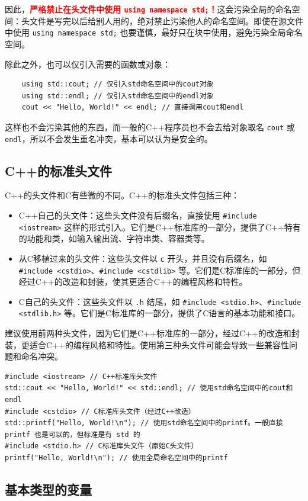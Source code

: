 因此，\textcolor{red}{\bfseries 严格禁止在头文件中使用 \texttt{using namespace std;}！}这会污染全局的命名空间：头文件是写完以后给别人用的，绝对禁止污染他人的命名空间。即使在源文件中使用 \verb|using namespace std;| 也要谨慎，最好只在块中使用，避免污染全局命名空间。

除此之外，也可以仅引入需要的函数或对象：
\begin{verbatim}
    using std::cout; // 仅引入std命名空间中的cout对象
    using std::endl; // 仅引入std命名空间中的endl对象
    cout << "Hello, World!" << endl; // 直接调用cout和endl
\end{verbatim}
这样也不会污染其他的东西，而一般的C++程序员也不会去给对象取名 \verb|cout| 或 \verb|endl|，所以不会发生重名冲突，基本可以认为是安全的。

\subsection{C++的标准头文件}

C++的头文件和C有些微的不同。C++的标准头文件包括三种：
\begin{itemize}
    \item C++自己的头文件：这些头文件没有后缀名，直接使用 \verb|#include <iostream>| 这样的形式引入。它们是C++标准库的一部分，提供了C++特有的功能和类，如输入输出流、字符串类、容器类等。
    \item 从C移植过来的头文件：这些头文件以 \verb|c| 开头，并且没有后缀名，如 \verb|#include <cstdio>|、\verb|#include <cstdlib>| 等。它们是C标准库的一部分，但经过C++的改造和封装，使其更适合C++的编程风格和特性。
    \item C自己的头文件：这些头文件以 \verb|.h| 结尾，如 \verb|#include <stdio.h>|、\verb|#include <stdlib.h>| 等。它们是C标准库的一部分，提供了C语言的基本功能和接口。
\end{itemize}
建议使用前两种头文件，因为它们是C++标准库的一部分，经过C++的改造和封装，更适合C++的编程风格和特性。使用第三种头文件可能会导致一些兼容性问题和命名冲突。
\begin{verbatim}
#include <iostream> // C++标准库头文件
std::cout << "Hello, World!" << std::endl; // 使用std命名空间中的cout和endl
#include <cstdio> // C标准库头文件（经过C++改造）
std::printf("Hello, World!\n"); // 使用std命名空间中的printf。一般直接 printf 也是可以的，但标准是有 std 的
#include <stdio.h> // C标准库头文件（原始C头文件）
printf("Hello, World!\n"); // 使用全局命名空间中的printf
\end{verbatim}

\subsection{基本类型的变量}

